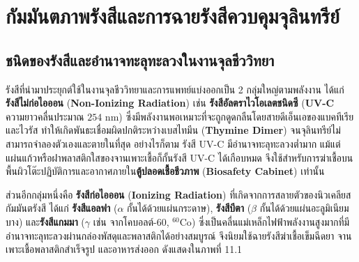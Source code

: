 \chapter{กัมมันตภาพรังสีและการฉายรังสีควบคุมจุลินทรีย์}

\section{ชนิดของรังสีและอำนาจทะลุทะลวงในงานจุลชีววิทยา}

รังสีที่นำมาประยุกต์ใช้ในงานจุลชีววิทยาและการแพทย์แบ่งออกเป็น 2 กลุ่มใหญ่ตามพลังงาน ได้แก่ \textbf{รังสีไม่ก่อไอออน} (\textbf{Non-Ionizing Radiation}) เช่น \textbf{รังสีอัลตราไวโอเลตชนิดซี} (\textbf{UV-C} ความยาวคลื่นประมาณ $254\text{ nm}$) ซึ่งมีพลังงานพอเหมาะที่จะถูกดูดกลืนโดยสายดีเอ็นเอของแบคทีเรียและไวรัส ทำให้เกิดพันธะเชื่อมผิดปกติระหว่างเบสไทมีน (\textbf{Thymine Dimer}) จนจุลินทรีย์ไม่สามารถจำลองตัวเองและตายในที่สุด อย่างไรก็ตาม รังสี UV-C มีอำนาจทะลุทะลวงต่ำมาก แม้แต่แผ่นแก้วหรือฝาพลาสติกใสของจานเพาะเชื้อก็กั้นรังสี UV-C ได้เกือบหมด จึงใช้สำหรับการฆ่าเชื้อบนพื้นผิวโต๊ะปฏิบัติการและอากาศภายใน\textbf{ตู้ปลอดเชื้อชีวภาพ} (\textbf{Biosafety Cabinet}) เท่านั้น

ส่วนอีกกลุ่มหนึ่งคือ \textbf{รังสีก่อไอออน} (\textbf{Ionizing Radiation}) ที่เกิดจากการสลายตัวของนิวเคลียสกัมมันตรังสี ได้แก่ \textbf{รังสีแอลฟา} ($\alpha$ กั้นได้ด้วยแผ่นกระดาษ), \textbf{รังสีบีตา} ($\beta$ กั้นได้ด้วยแผ่นอะลูมิเนียมบาง) และ\textbf{รังสีแกมมา} ($\gamma$ เช่น จากโคบอลต์-60, $^{60}\text{Co}$) ซึ่งเป็นคลื่นแม่เหล็กไฟฟ้าพลังงานสูงมากที่มีอำนาจทะลุทะลวงผ่านกล่องพัสดุและพลาสติกได้อย่างสมบูรณ์ จึงนิยมใช้ฉายรังสีฆ่าเชื้อเข็มฉีดยา จานเพาะเชื้อพลาสติกสำเร็จรูป และอาหารส่งออก ดังแสดงใน\mbox{ภาพที่} 11.1

